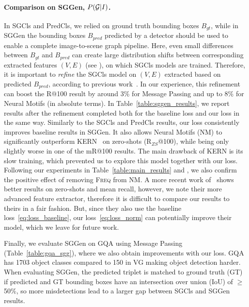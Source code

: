 \paragraph{Comparison on SGGen, $P ({\cal G}|I)$.}
In SGCls and PredCls, we relied on ground truth bounding boxes $B_{gt}$, while in SGGen the bounding boxes $B_{pred}$ predicted by a detector should be used to enable a complete image-to-scene graph pipeline. Here, even small differences between $B_{gt}$ and $B_{pred}$ can create large distribution shifts between corresponding extracted features $(V,E)$ (see \secref{\ref{sec:baseline}}), on which SGCls models are trained. Therefore, it is important to \textit{refine} the SGCls model on $(V,E)$ extracted based on predicted $B_{pred}$, according to previous work~\citep{zellers2018neural,chen2019knowledge}. In our experience, this refinement can boost the R@100 result by around 3\% for Message Passing and up to 8\% for Neural Motifs (in absolute terms). In Table~\ref{table:sggen_results}, we report results after the refinement completed both for the baseline loss and our loss in the same way. Similarly to the SGCls and PredCls results, our loss consistently improves baseline results in SGGen. It also allows Neural Motifs (NM) to significantly outperform KERN~\citep{chen2019knowledge} on zero-shots (R$_{ZS}$@100), while being only slightly worse in one of the mR@100 results. The main drawback of KERN is its slow training, which prevented us to explore this model together with our loss. 
Following our experiments in Table~\ref{table:main_results} and \fig{\ref{fig:freq}}, we also confirm the positive effect of removing \textsc{Freq} from NM.
A more recent work of~\citet{tang2020unbiased} shows better results on zero-shots and mean recall, however, we note their more advanced feature extractor, therefore it is difficult to compare our results to theirs in a fair fashion. But, since they also use the baseline loss~\eqref{eq:loss_baseline}, our loss~\eqref{eq:loss_norm} can potentially improve their model, which we leave for future work. 



Finally, we evaluate SGGen on GQA using Message Passing (Table~\ref{table:gqa_sgg}), where we also obtain improvements with our loss. GQA has 1703 object classes compared to 150 in VG making object detection harder. When evaluating SGGen, the predicted triplet is matched to ground truth (GT) if predicted and GT bounding boxes have an intersection over union (IoU) of $\geq$50\%, so more misdetections lead to a larger gap between SGCls and SGGen results.

